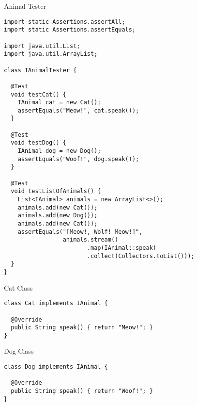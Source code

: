 \begin{cl}[]{Animal Tester}
\begin{lstlisting}[language=MyJava]
import static Assertions.assertAll;
import static Assertions.assertEquals;

import java.util.List;
import java.util.ArrayList;

class IAnimalTester {
  
  @Test
  void testCat() {
    IAnimal cat = new Cat();
    assertEquals("Meow!", cat.speak());
  }

  @Test
  void testDog() {
    IAnimal dog = new Dog();
    assertEquals("Woof!", dog.speak());
  }

  @Test
  void testListOfAnimals() {
    List<IAnimal> animals = new ArrayList<>();
    animals.add(new Cat());
    animals.add(new Dog());
    animals.add(new Cat());
    assertEquals("[Meow!, Wolf! Meow!]", 
                 animals.stream()
                        .map(IAnimal::speak)
                        .collect(Collectors.toList()));
  }
}
\end{lstlisting}
\end{cl}

\begin{cl}[]{Cat Class}
\begin{lstlisting}[language=MyJava]
class Cat implements IAnimal {

  @Override
  public String speak() { return "Meow!"; }
}
\end{lstlisting}
\end{cl}

\begin{cl}[]{Dog Class}
\begin{lstlisting}[language=MyJava]
class Dog implements IAnimal {

  @Override
  public String speak() { return "Woof!"; }
}
\end{lstlisting}
\end{cl}


